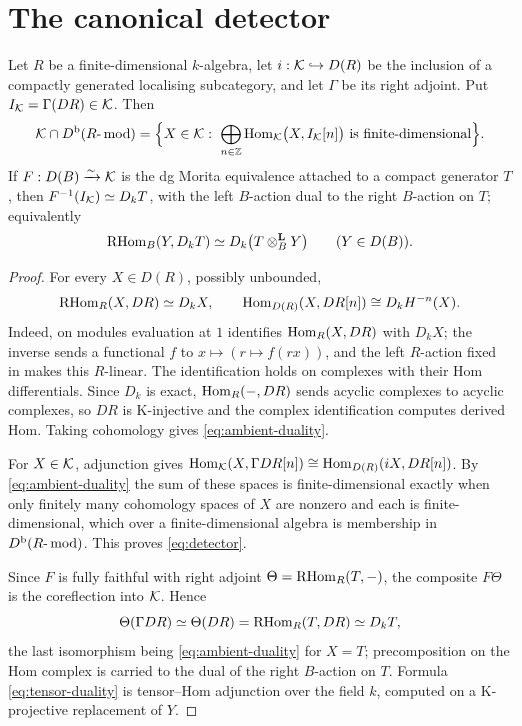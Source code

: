 \section{The canonical detector}\label{sec:detector}

\begin{theorem}\label{thm:detector}
Let \(R\) be a finite-dimensional \(k\)-algebra, let \(i:\mathcal K\hookrightarrow D(R)\) be the inclusion of a compactly generated localising subcategory, and let \(\Gamma\) be its right adjoint.  Put \(I_{\mathcal K}=\Gamma(DR)\in\mathcal K\).  Then
\begin{equation}\label{eq:detector}
 \cK\cap\Db(R\text{-}\modcat)
 =\Bigl\{X\in\cK:\ \bigoplus_{n\in\bbZ}\Hom_{\cK}\bigl(X,I_{\cK}[n]\bigr)\text{ is finite-dimensional}\Bigr\}.
\end{equation}
If \(F:D(B)\xrightarrow{\sim}\mathcal K\) is the dg Morita equivalence attached to a compact generator \(T\), then \(F^{-1}(I_{\mathcal K})\simeq D_kT\), with the left \(B\)-action dual to the right \(B\)-action on \(T\); equivalently
\begin{equation}\label{eq:tensor-duality}
 \operatorname{RHom}_B(Y,D_kT)\simeq D_k\bigl(T\otimes^{\mathbf L}_BY\bigr)\qquad(Y\in D(B)).
\end{equation}
\end{theorem}

\begin{proof}
For every \(X\in D(R)\), possibly unbounded,
\begin{equation}\label{eq:ambient-duality}
 \operatorname{RHom}_R(X,DR)\simeq D_kX,\qquad \operatorname{Hom}_{D(R)}(X,DR[n])\cong D_kH^{-n}(X).
\end{equation}
Indeed, on modules evaluation at \(1\) identifies \(\operatorname{Hom}_R(X,DR)\) with \(D_kX\); the inverse sends a functional \(f\) to \(x\mapsto(r\mapsto f(rx))\), and the left \(R\)-action fixed in  makes this \(R\)-linear.  The identification holds on complexes with their Hom differentials.  Since \(D_k\) is exact, \(\operatorname{Hom}_R(-,DR)\) sends acyclic complexes to acyclic complexes, so \(DR\) is K-injective and the complex identification computes derived Hom.  Taking cohomology gives \eqref{eq:ambient-duality}.

For \(X\in\mathcal K\), adjunction gives \(\operatorname{Hom}_{\mathcal K}(X,\Gamma DR[n])\cong\operatorname{Hom}_{D(R)}(iX,DR[n])\).  By \eqref{eq:ambient-duality} the sum of these spaces is finite-dimensional exactly when only finitely many cohomology spaces of \(X\) are nonzero and each is finite-dimensional, which over a finite-dimensional algebra is membership in \(D^{\mathrm b}(R\text{-}\operatorname{mod})\).  This proves \eqref{eq:detector}.

Since \(F\) is fully faithful with right adjoint \(\Theta=\operatorname{RHom}_R(T,-)\), the composite \(F\Theta\) is the coreflection into \(\mathcal K\).  Hence
\[
 \Theta(\Gamma DR)\simeq\Theta(DR)=\operatorname{RHom}_R(T,DR)\simeq D_kT,
\]
the last isomorphism being \eqref{eq:ambient-duality} for \(X=T\); precomposition on the Hom complex is carried to the dual of the right \(B\)-action on \(T\).  Formula \eqref{eq:tensor-duality} is tensor--Hom adjunction over the field \(k\), computed on a K-projective replacement of \(Y\).
\end{proof}

